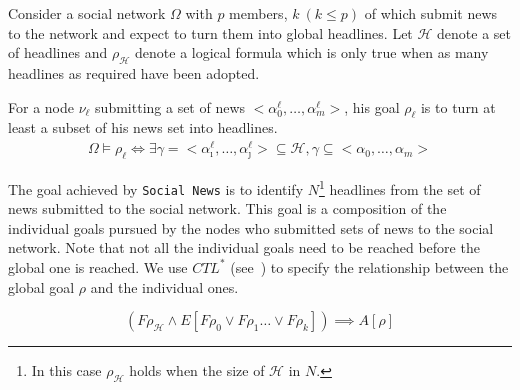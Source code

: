 Consider a social network $\Omega$ with $p$ members, $k~(k\leq p)$ of which submit news to the network and expect to turn
them into global headlines. Let $\mathcal{H}$ denote a set of headlines and $\rho_\mathcal{H}$ denote a logical formula
which is only true when as many headlines as required have been adopted.

For a node $\nu_\ell$ submitting a set of news $<\alpha_{0}^\ell,\ldots,\alpha_m^\ell>$, his goal $\rho_\ell$ is to turn at least a subset of his news set into headlines. 
\begin{equation}
	\label{eq:indgoals}
	\begin{gathered}
		\Omega\vDash\rho_\ell \iff\exists\gamma=<\alpha_\imath^\ell,\ldots,\alpha_\jmath^\ell>\subseteq\mathcal{H},
		\gamma\subseteq <\alpha_0,\ldots,\alpha_m>
	\end{gathered}
\end{equation}

The goal achieved by {\tt Social News} is to identify $N$\footnote{In this case $\rho_\mathcal{H}$ holds when the size of
$\mathcal{H}$ in $N$.} headlines from the set of news submitted to the social network. This goal is a composition of the
individual goals pursued by the nodes who submitted sets of news to the social network. Note that not all the individual
goals need to be reached before the global one is reached. We use $CTL^*$ (see~\cite{Emerson-Halpern:86}) to specify the
relationship between the global goal $\rho$ and the individual ones.

\begin{equation}
	\label{eq:appgoal}
	(F\rho_\mathcal{H}\wedge E[F\rho_0\vee F\rho_1\ldots \vee F\rho_k])\implies A[\rho]
\end{equation}



